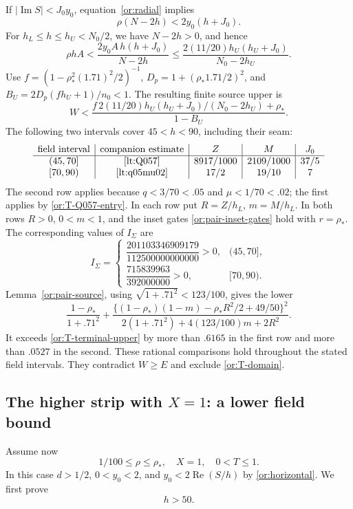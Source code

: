\documentclass[11pt,reqno]{amsart}
\numberwithin{equation}{section}
\theoremstyle{definition}
\theoremstyle{remark}
\renewcommand{\Re}{\operatorname{Re}}
\renewcommand{\Im}{\operatorname{Im}}
\begin{document}
If $|\Im S|<J_0y_0$, equation~\eqref{or:radial} implies
\[
                   \rho(N-2h)<2y_0(h+J_0).
\]
For $h_L\le h\le h_U<N_0/2$, we have $N-2h>0$, and hence
\[
 \rho hA<\frac{2y_0A\,h(h+J_0)}{N-2h}
       \le\frac{2(11/20)h_U(h_U+J_0)}{N_0-2h_U}.
\]
Use $f=(1-\rho_*^2(1.71)^2/2)^{-1}$,
$D_p=1+(\rho_*1.71/2)^2$, and
$B_U=2D_p(fh_U+1)/n_0<1$.  The resulting finite source upper is
\begin{equation}\label{or:T-terminal-upper}
 W<\frac{f\,2(11/20)h_U(h_U+J_0)/(N_0-2h_U)+\rho_*}{1-B_U}.
\end{equation}
The following two intervals cover $45<h<90$, including their seam:
\begin{equation}\label{or:T-terminal-table}
\begin{array}{c|c|c|c|c}
 \text{field interval}&\text{companion estimate}&Z&M&J_0\\ \hline
 (45,70]&\eqref{lt:Q057}&8917/1000&2109/1000&37/5\\
 {}[70,90)&\ref{lt:q05mu02}&17/2&19/10&7
\end{array}
\end{equation}
The second row applies because $q<3/70<.05$ and $\mu<1/70<.02$;
the first applies by \eqref{or:T-Q057-entry}.
In each row put $R=Z/h_L$, $m=M/h_L$.
In both rows $R>0$, $0<m<1$, and the inset gates
\eqref{or:pair-inset-gates} hold with $r=\rho_*$.
The corresponding values of $I_\Sigma$ are
\[
 I_\Sigma=
 \begin{cases}
  \dfrac{201103346909179}{112500000000000}>0,&(45,70],\\[3pt]
  \dfrac{715839963}{392000000}>0,&[70,90).
 \end{cases}
\]
Lemma~\ref{or:pair-source}, using
$\sqrt{1+.71^2}<123/100$, gives the lower
\begin{equation}\label{or:T-terminal-lower}
 \frac{1-\rho_*}{1+.71^2}+
 \frac{\{(1-\rho_*)(1-m)-\rho_*R^2/2+49/50\}^2}
 {2(1+.71^2)+4(123/100)m+2R^2}.
\end{equation}
It exceeds \eqref{or:T-terminal-upper} by more than $.6165$ in the
first row and more than $.0527$ in the second.  These rational
comparisons hold throughout the stated field intervals.
They contradict $W\ge E$ and exclude
\eqref{or:T-domain}.

\subsection{The higher strip with $X=1$: a lower field bound}

Assume now
\begin{equation}\label{or:X-domain}
             1/100\le\rho\le\rho_*,\quad X=1,\quad0<T\le1.
\end{equation}
In this case $d>1/2$, $0<y_0<2$, and
$y_0<2\Re(S/h)$ by \eqref{or:horizontal}.  We first prove
\begin{equation}\label{or:X-h50}
                                   h>50.
\end{equation}
\end{document}
